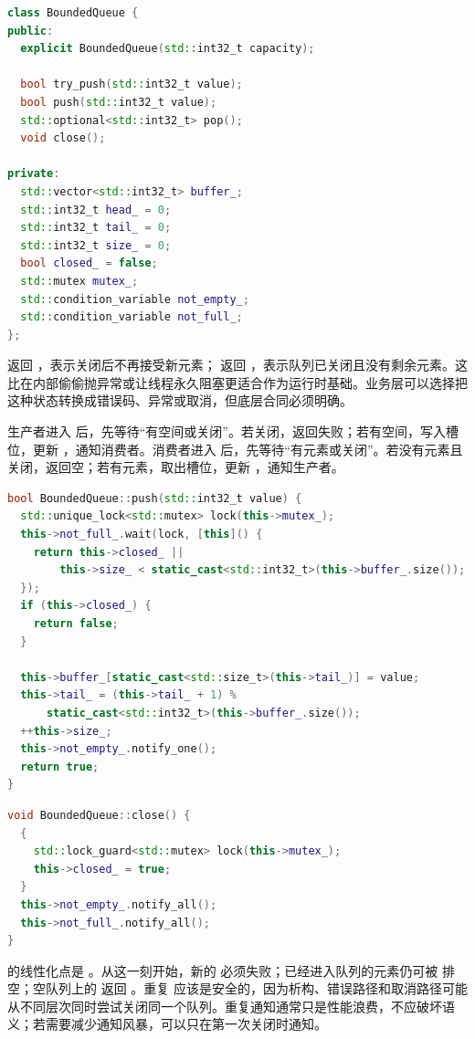 \begin{lstlisting}[language=C++,caption={有关闭语义的有界队列接口草图}]
class BoundedQueue {
public:
  explicit BoundedQueue(std::int32_t capacity);

  bool try_push(std::int32_t value);
  bool push(std::int32_t value);
  std::optional<std::int32_t> pop();
  void close();

private:
  std::vector<std::int32_t> buffer_;
  std::int32_t head_ = 0;
  std::int32_t tail_ = 0;
  std::int32_t size_ = 0;
  bool closed_ = false;
  std::mutex mutex_;
  std::condition_variable not_empty_;
  std::condition_variable not_full_;
};
\end{lstlisting}

 返回 ，表示关闭后不再接受新元素； 返回 ，表示队列已关闭且没有剩余元素。这比在内部偷偷抛异常或让线程永久阻塞更适合作为运行时基础。业务层可以选择把这种状态转换成错误码、异常或取消，但底层合同必须明确。

生产者进入  后，先等待“有空间或关闭”。若关闭，返回失败；若有空间，写入槽位，更新 ，通知消费者。消费者进入  后，先等待“有元素或关闭”。若没有元素且关闭，返回空；若有元素，取出槽位，更新 ，通知生产者。

\begin{lstlisting}[language=C++,caption={push 的谓词包含关闭状态}]
bool BoundedQueue::push(std::int32_t value) {
  std::unique_lock<std::mutex> lock(this->mutex_);
  this->not_full_.wait(lock, [this]() {
    return this->closed_ ||
        this->size_ < static_cast<std::int32_t>(this->buffer_.size());
  });
  if (this->closed_) {
    return false;
  }

  this->buffer_[static_cast<std::size_t>(this->tail_)] = value;
  this->tail_ = (this->tail_ + 1) %
      static_cast<std::int32_t>(this->buffer_.size());
  ++this->size_;
  this->not_empty_.notify_one();
  return true;
}
\end{lstlisting}

\begin{lstlisting}[language=C++,caption={close 必须唤醒所有可能等待的谓词}]
void BoundedQueue::close() {
  {
    std::lock_guard<std::mutex> lock(this->mutex_);
    this->closed_ = true;
  }
  this->not_empty_.notify_all();
  this->not_full_.notify_all();
}
\end{lstlisting}

 的线性化点是 。从这一刻开始，新的  必须失败；已经进入队列的元素仍可被  排空；空队列上的  返回 。重复  应该是安全的，因为析构、错误路径和取消路径可能从不同层次同时尝试关闭同一个队列。重复通知通常只是性能浪费，不应破坏语义；若需要减少通知风暴，可以只在第一次关闭时通知。

